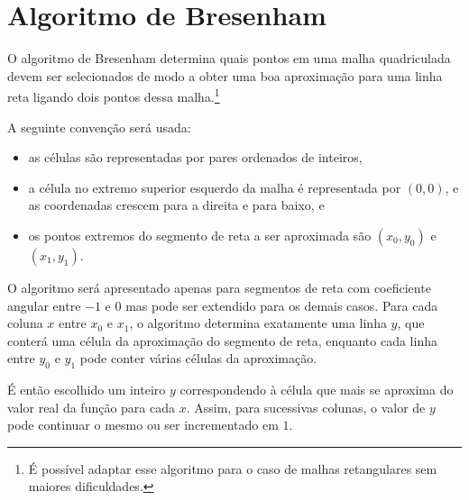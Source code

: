 %
%
%

\section{Algoritmo de Bresenham} \label{sse:bresenham_line}
O algoritmo de Bresenham determina quais pontos em uma malha quadriculada
devem ser selecionados de modo a obter uma boa aproximação
para uma linha reta ligando dois pontos dessa malha.\footnote{É possível adaptar
esse algoritmo para o caso de malhas retangulares sem maiores dificuldades.}

A seguinte convenção será usada:
\begin{itemize}
\item as células são representadas por pares ordenados de inteiros,
\item a célula no extremo superior esquerdo da malha é representada por
$(0,0)$, e as coordenadas crescem para a direita e para baixo, e
\item os pontos extremos do segmento de reta a ser aproximada são $(x_0,y_0)$
e  $(x_1,y_1)$.
\end{itemize}

O algoritmo será apresentado apenas para segmentos de reta com coeficiente
angular entre $-1$ e $0$ mas pode ser extendido para os demais casos. Para cada
coluna $x$ entre $x_0$ e $x_1$, o algoritmo determina exatamente uma linha $y$,
que conterá uma célula da aproximação do segmento de reta, enquanto cada linha
entre $y_0$ e $y_1$ pode conter várias células da aproximação.

É então escolhido um inteiro $y$ correspondendo à célula
que mais se aproxima do valor real da função para cada $x$. Assim, para
sucessivas colunas, o valor de $y$ pode continuar o mesmo ou ser incrementado
em $1$.


